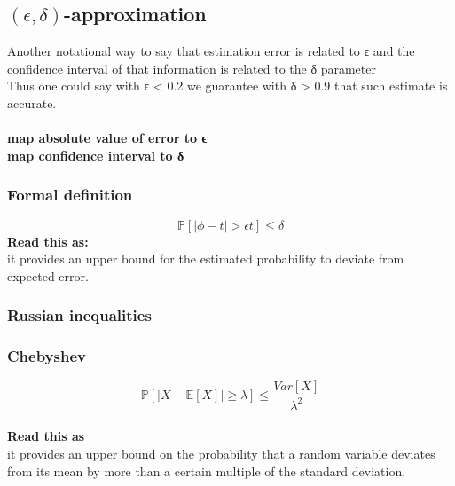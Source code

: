 \subsection{$(\epsilon, \delta)$-approximation}

Another notational way to say that estimation error is related to ϵ and the confidence interval of that information is related to the δ parameter
\\
Thus one could say with ϵ < 0.2 we guarantee with δ > 0.9 that such estimate is accurate.
\\\\
\textbf{map absolute value of error to ϵ}
\\
\textbf{map confidence interval to δ}

\subsubsection{Formal definition}

\begin{equation}
	\mathds{P}[|\phi - t| > \epsilon t] \le \delta
	\label{eq:eps-delta approximtion}
\end{equation}
\textbf{Read this as:}
\\
it provides an upper bound for the estimated probability to deviate from expected error.

\subsubsection{Russian inequalities}

\subsubsection{Chebyshev}

\begin{equation}
	\mathds{P}[|X - \mathds{E}[X] | \ge \lambda] \le \frac{Var[X]}{\lambda^2}
	\label{eq:Chebyshev inequality}
\end{equation}
\\
\textbf{Read this as}
\\
it provides an upper bound on the probability that a random variable deviates from its mean by more than a certain multiple of the standard deviation.
